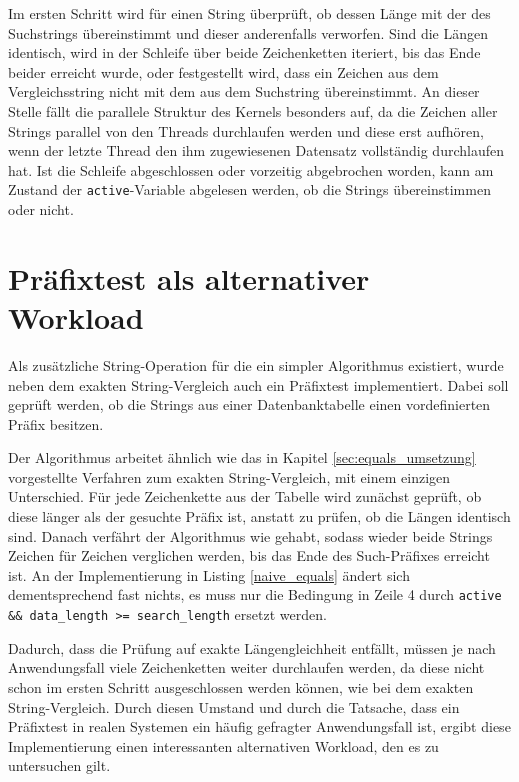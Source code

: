 Im ersten Schritt wird für einen String überprüft, ob dessen Länge mit der des Suchstrings übereinstimmt und dieser anderenfalls verworfen.
Sind die Längen identisch, wird in der Schleife über beide Zeichenketten iteriert, bis das Ende beider erreicht wurde, oder festgestellt wird, dass ein Zeichen aus dem Vergleichsstring nicht mit dem aus dem Suchstring übereinstimmt.
An dieser Stelle fällt die parallele Struktur des Kernels besonders auf, da die Zeichen aller Strings parallel von den Threads durchlaufen werden und diese erst aufhören, wenn der letzte Thread den ihm zugewiesenen Datensatz vollständig durchlaufen hat.
Ist die Schleife abgeschlossen oder vorzeitig abgebrochen worden, kann am Zustand der \texttt{active}-Variable abgelesen werden, ob die Strings übereinstimmen oder nicht.

\section{Präfixtest als alternativer Workload}
\label{sec:prefixtest}

Als zusätzliche String-Operation für die ein simpler Algorithmus existiert, wurde neben dem exakten String-Vergleich auch ein Präfixtest implementiert.
Dabei soll geprüft werden, ob die Strings aus einer Datenbanktabelle einen vordefinierten Präfix besitzen.

Der Algorithmus arbeitet ähnlich wie das in Kapitel \ref{sec:equals_umsetzung} vorgestellte Verfahren zum exakten String-Vergleich, mit einem einzigen Unterschied.
Für jede Zeichenkette aus der Tabelle wird zunächst geprüft, ob diese länger als der gesuchte Präfix ist, anstatt zu prüfen, ob die Längen identisch sind.
Danach verfährt der Algorithmus wie gehabt, sodass wieder beide Strings Zeichen für Zeichen verglichen werden, bis das Ende des Such-Präfixes erreicht ist.
An der Implementierung in Listing \ref{naive_equals} ändert sich dementsprechend fast nichts, es muss nur die Bedingung in Zeile 4 durch \texttt{active \&\& data\_length >= search\_length} ersetzt werden.

Dadurch, dass die Prüfung auf exakte Längengleichheit entfällt, müssen je nach Anwendungsfall viele Zeichenketten weiter durchlaufen werden, da diese nicht schon im ersten Schritt ausgeschlossen werden können, wie bei dem exakten String-Vergleich.
Durch diesen Umstand und durch die Tatsache, dass ein Präfixtest in realen Systemen ein häufig gefragter Anwendungsfall ist, ergibt diese Implementierung einen interessanten alternativen Workload, den es zu untersuchen gilt.

